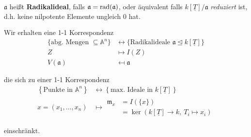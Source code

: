 $\mathfrak{a}$ heißt \textbf{Radikalideal},
falls $\mathfrak{a}=\operatorname{rad}(\mathfrak{a})$, oder äquivalent falls $k[\underline{T}]/\mathfrak{a}$
\emph{reduziert} ist, d.h. keine nilpotente Elemente ungleich $0$ hat.
\begin{cor}
  \label{cor:korrespondenz-radikalideal-abgeschlossene-mengen}
  Wir erhalten eine 1-1 Korrespondenz
  \begin{align*}
    \{\text{abg. Mengen }\subseteq\mathbb{A}^{n}\} & \leftrightarrow\{\text{Radikalideale }\mathfrak{a}\unlhd k[\underline{T}]\}\\
    Z & \mapsto I(Z)\\
    V(\mathfrak{a}) & \mapsfrom\mathfrak{a}
  \end{align*}

  die sich zu einer 1-1 Korrespondenz
  \begin{align*}
    \left\{ \text{Punkte in }\mathbb{A}^{n}\right\}
    & \leftrightarrow\left\{ \text{max. Ideale in }k[\underline{T}]\right\} \\
    x=(x_{1},\ldots,x_{n})
    & \mapsto
      \begin{array}{rl}
        \mathfrak{m}_{x} & =I(\{x\})\\
                         & =\ker(k[\underline{T}]\rightarrow k,\ T_{i}\mapsto x_{i})
      \end{array}
  \end{align*}

  einschränkt.
\end{cor}
